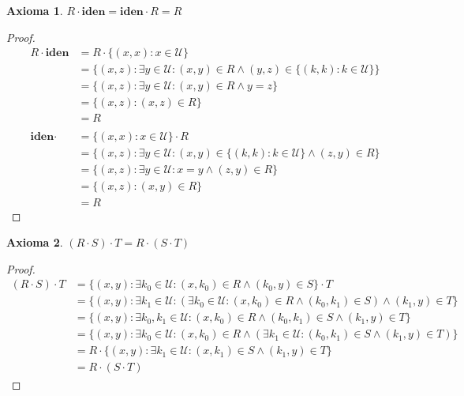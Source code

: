 \documentclass{article}
\newtheorem*{axiom}{Axioma}
\newcommand{\U}{\mathcal{U}}
\newcommand{\iden}{\textbf{iden}}
\begin{document}
\begin{axiom}
  $R \cdot \iden = \iden \cdot R = R$
\end{axiom}
\begin{proof}
  \begin{equation*}
    \begin{aligned}
      R \cdot \iden &= R \cdot \{(x, x) : x \in \U\} \\ 
                    &= \{(x, z) : \exists y \in \U : (x, y) \in R \land (y, z) \in \{(k, k) : k \in \U\}\} \\ 
                    &= \{(x, z) : \exists y \in \U : (x, y) \in R \land y = z\} \\ 
                    &= \{(x, z) : (x, z) \in R\} \\ 
                    &= R \\ 
                    \\ 
      \iden \cdot &= \{(x, x) : x \in \U\} \cdot R \\ 
                    &= \{(x, z) : \exists y \in \U : (x, y) \in \{(k, k) : k \in \U\} \land (z, y) \in R\} \\ 
                    &= \{(x, z) : \exists y \in \U : x = y \land (z, y) \in R\} \\ 
                    &= \{(x, z) : (x, y) \in R\} \\ 
                    &= R
    \end{aligned}
  \end{equation*}
\end{proof}

\begin{axiom}
  $(R \cdot S) \cdot T = R \cdot (S \cdot T)$
\end{axiom}
\begin{proof}
  \begin{equation*}
    \begin{aligned}
      (R \cdot S) \cdot T &= \{(x, y) : \exists k_0 \in \U : (x, k_0) \in R \land (k_0, y) \in S\} \cdot T \\ 
                          &= \{(x, y) : \exists k_1 \in \U : (\exists k_0 \in \U : (x, k_0) \in R \land (k_0, k_1) \in S) \land (k_1, y) \in T\} \\ 
                          &= \{(x, y) : \exists k_0, k_1 \in \U : (x, k_0) \in R \land (k_0, k_1) \in S \land (k_1, y) \in T\} \\ 
                          &= \{(x, y) : \exists k_0 \in \U : (x, k_0) \in R \land (\exists k_1 \in \U: (k_0, k_1) \in S \land (k_1, y) \in T)\} \\ 
                          &= R \cdot \{(x, y) : \exists k_1 \in \U : (x, k_1) \in S \land (k_1, y) \in T\} \\ 
                          &= R \cdot (S \cdot T)
    \end{aligned}
  \end{equation*}
\end{proof}
\end{document}
